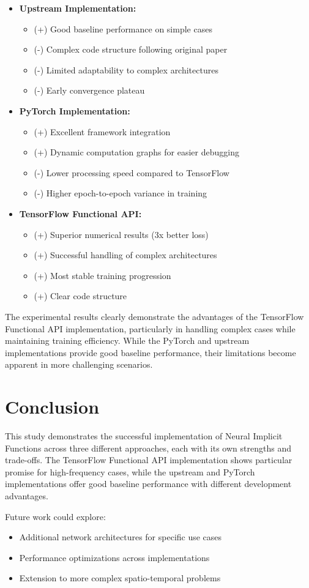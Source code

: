 \documentclass[10pt,journal,compsoc,onecolumn]{IEEEtran}
\begin{document}
\begin{itemize}
    \item \textbf{Upstream Implementation:}
    \begin{itemize}
        \item (+) Good baseline performance on simple cases
        \item (-) Complex code structure following original paper
        \item (-) Limited adaptability to complex architectures
        \item (-) Early convergence plateau
    \end{itemize}
    
    \item \textbf{PyTorch Implementation:}
    \begin{itemize}
        \item (+) Excellent framework integration
        \item (+) Dynamic computation graphs for easier debugging
        \item (-) Lower processing speed compared to TensorFlow
        \item (-) Higher epoch-to-epoch variance in training
    \end{itemize}
    
    \item \textbf{TensorFlow Functional API:}
    \begin{itemize}
        \item (+) Superior numerical results (3x better loss)
        \item (+) Successful handling of complex architectures
        \item (+) Most stable training progression
        \item (+) Clear code structure
    \end{itemize}
\end{itemize}

The experimental results clearly demonstrate the advantages of the TensorFlow Functional API implementation, particularly in handling complex cases while maintaining training efficiency. While the PyTorch and upstream implementations provide good baseline performance, their limitations become apparent in more challenging scenarios.

\section{Conclusion}
This study demonstrates the successful implementation of Neural Implicit Functions across three different approaches, each with its own strengths and trade-offs. The TensorFlow Functional API implementation shows particular promise for high-frequency cases, while the upstream and PyTorch implementations offer good baseline performance with different development advantages.

Future work could explore:
\begin{itemize}
    \item Additional network architectures for specific use cases
    \item Performance optimizations across implementations
    \item Extension to more complex spatio-temporal problems
\end{itemize}



\end{document}
